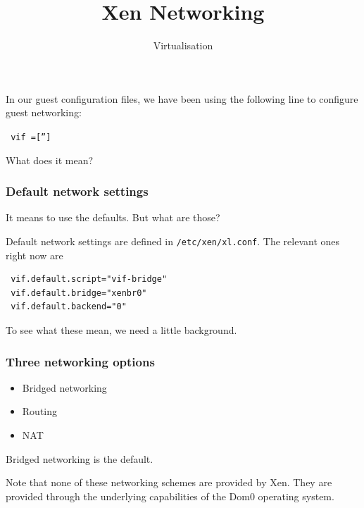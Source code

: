 \documentclass[10pt]{beamer}
\title{Xen Networking}
\author[ID720]{Virtualisation}
\institute[Otago Polytechnic]{
  Otago Polytechnic \\
  Dunedin, New Zealand \\
}
\date{}
\begin{document}
\begin{frame}[plain]
  \titlepage
\end{frame}


\begin{frame}
  
  In our guest configuration files, we have been using the following line to configure guest networking:
  
  \vspace{5mm}
  
  \texttt{ vif =['']}
  
  \vspace{5mm}
  What does it mean?
  
  \end{frame}
  

\begin{frame}[fragile]
  \frametitle{Default network settings}
  
   It means to use the defaults. But what are those?
   
  \vspace{5mm}
  Default network settings are defined in \texttt{/etc/xen/xl.conf}. The relevant ones right now are
  
  \vspace{5mm}
  

\begin{verbatim}
 vif.default.script="vif-bridge"
 vif.default.bridge="xenbr0"
 vif.default.backend="0"
\end{verbatim}

\vspace{5mm}
To see what these mean, we need a little background.
\end{frame}

\begin{frame}
  \frametitle{Three networking options}
  
  \begin{itemize}
    \item Bridged networking
    \item Routing
    \item NAT
  \end{itemize}
  
  Bridged networking is the default.
  
  \vspace{5mm}
  Note that none of these networking schemes are provided by Xen. They are provided through
  the underlying capabilities of the Dom0 operating system.
  
  \end{frame}
\end{document}
